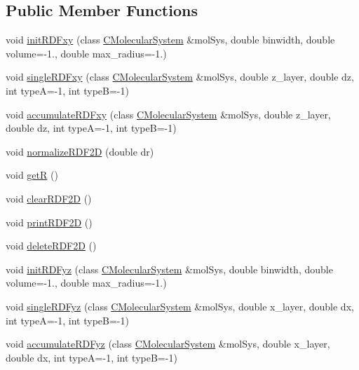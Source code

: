 \subsection*{Public Member Functions}
\begin{DoxyCompactItemize}
\item 
void \mbox{\hyperlink{classRdf2D_a767f006de6412394a59f1cae5f7f6b35}{init\+R\+D\+Fxy}} (class \mbox{\hyperlink{classCMolecularSystem}{C\+Molecular\+System}} \&mol\+Sys, double binwidth, double volume=-\/1., double max\+\_\+radius=-\/1.)
\item 
void \mbox{\hyperlink{classRdf2D_afc5ff73aa9c126184e94ee3abfc14ff4}{single\+R\+D\+Fxy}} (class \mbox{\hyperlink{classCMolecularSystem}{C\+Molecular\+System}} \&mol\+Sys, double z\+\_\+layer, double dz, int typeA=-\/1, int typeB=-\/1)
\item 
void \mbox{\hyperlink{classRdf2D_a6c716851d80fd2a7dcfefd219892d87b}{accumulate\+R\+D\+Fxy}} (class \mbox{\hyperlink{classCMolecularSystem}{C\+Molecular\+System}} \&mol\+Sys, double z\+\_\+layer, double dz, int typeA=-\/1, int typeB=-\/1)
\item 
void \mbox{\hyperlink{classRdf2D_aaf6d00ec728e8c694ed2932332691c0d}{normalize\+R\+D\+F2D}} (double dr)
\item 
void \mbox{\hyperlink{classRdf2D_a3c8153b303733b7e5d320f9b20f37b32}{getR}} ()
\item 
void \mbox{\hyperlink{classRdf2D_a9658a9bb2229afda0d743bdc05a27411}{clear\+R\+D\+F2D}} ()
\item 
void \mbox{\hyperlink{classRdf2D_aae00c1526117f6ac63d2c13354b6c404}{print\+R\+D\+F2D}} ()
\item 
void \mbox{\hyperlink{classRdf2D_a8008421c8aedff5887160b455879d36b}{delete\+R\+D\+F2D}} ()
\item 
void \mbox{\hyperlink{classRdf2D_adf8c5b9d02268de9ee5ebab8cfe7f3df}{init\+R\+D\+Fyz}} (class \mbox{\hyperlink{classCMolecularSystem}{C\+Molecular\+System}} \&mol\+Sys, double binwidth, double volume=-\/1., double max\+\_\+radius=-\/1.)
\item 
void \mbox{\hyperlink{classRdf2D_a4e77d415c344954480a121f79a4aab6b}{single\+R\+D\+Fyz}} (class \mbox{\hyperlink{classCMolecularSystem}{C\+Molecular\+System}} \&mol\+Sys, double x\+\_\+layer, double dx, int typeA=-\/1, int typeB=-\/1)
\item 
void \mbox{\hyperlink{classRdf2D_a26d388ff4f8b626c22fa3ea12332e1d7}{accumulate\+R\+D\+Fyz}} (class \mbox{\hyperlink{classCMolecularSystem}{C\+Molecular\+System}} \&mol\+Sys, double x\+\_\+layer, double dx, int typeA=-\/1, int typeB=-\/1)
\end{DoxyCompactItemize}
